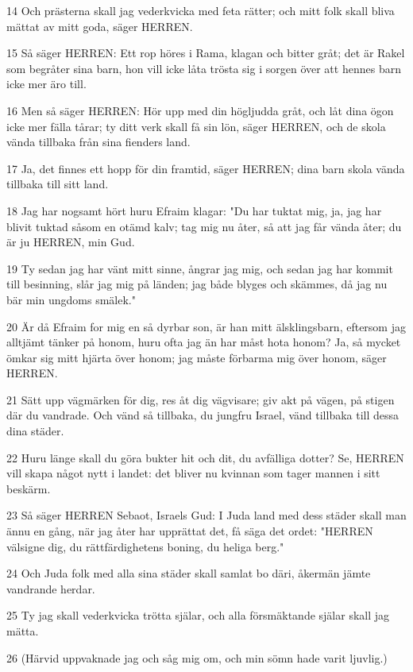 \par 14 Och prästerna skall jag vederkvicka med feta rätter; och mitt folk skall bliva mättat av mitt goda, säger HERREN.
\par 15 Så säger HERREN: Ett rop höres i Rama, klagan och bitter gråt; det är Rakel som begråter sina barn, hon vill icke låta trösta sig i sorgen över att hennes barn icke mer äro till.
\par 16 Men så säger HERREN: Hör upp med din högljudda gråt, och låt dina ögon icke mer fälla tårar; ty ditt verk skall få sin lön, säger HERREN, och de skola vända tillbaka från sina fienders land.
\par 17 Ja, det finnes ett hopp för din framtid, säger HERREN; dina barn skola vända tillbaka till sitt land.
\par 18 Jag har nogsamt hört huru Efraim klagar: "Du har tuktat mig, ja, jag har blivit tuktad såsom en otämd kalv; tag mig nu åter, så att jag får vända åter; du är ju HERREN, min Gud.
\par 19 Ty sedan jag har vänt mitt sinne, ångrar jag mig, och sedan jag har kommit till besinning, slår jag mig på länden; jag både blyges och skämmes, då jag nu bär min ungdoms smälek."
\par 20 Är då Efraim for mig en så dyrbar son, är han mitt älsklingsbarn, eftersom jag alltjämt tänker på honom, huru ofta jag än har måst hota honom? Ja, så mycket ömkar sig mitt hjärta över honom; jag måste förbarma mig över honom, säger HERREN.
\par 21 Sätt upp vägmärken för dig, res åt dig vägvisare; giv akt på vägen, på stigen där du vandrade. Och vänd så tillbaka, du jungfru Israel, vänd tillbaka till dessa dina städer.
\par 22 Huru länge skall du göra bukter hit och dit, du avfälliga dotter? Se, HERREN vill skapa något nytt i landet: det bliver nu kvinnan som tager mannen i sitt beskärm.
\par 23 Så säger HERREN Sebaot, Israels Gud: I Juda land med dess städer skall man ännu en gång, när jag åter har upprättat det, få säga det ordet: "HERREN välsigne dig, du rättfärdighetens boning, du heliga berg."
\par 24 Och Juda folk med alla sina städer skall samlat bo däri, åkermän jämte vandrande herdar.
\par 25 Ty jag skall vederkvicka trötta själar, och alla försmäktande själar skall jag mätta.
\par 26 (Härvid uppvaknade jag och såg mig om, och min sömn hade varit ljuvlig.)
